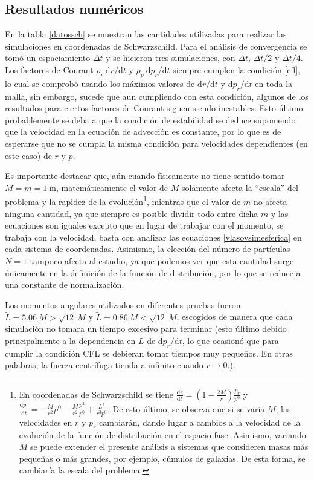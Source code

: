 \documentclass[11pt,twoside,openright,spanish]{report}
\numberwithin{equation}{chapter}
\numberwithin{figure}{chapter}
\numberwithin{table}{chapter}
\begin{document}
\subsection{Resultados numéricos}
\noindent
En la tabla \ref{datossch} se muestran las cantidades utilizadas para realizar las simulaciones en coordenadas de Schwarzschild. Para el análisis de convergencia se tomó un espaciamiento $\Delta t$ y se hicieron tres simulaciones, con $\Delta t$, $\Delta t/2$ y $\Delta t/4$. Los factores de Courant $\rho_r\ \text{d}r/\text{d}t$ y $\rho_p\ \text{d}p_r/\text{d}t$ siempre cumplen la condición \eqref{cfl}, lo cual se comprobó usando los máximos valores de $\text{d}r/\text{d}t$ y $\text{d}p_r/\text{d}t$ en toda la malla, sin embargo, sucede que aun cumpliendo con esta condición, algunos de los resultados para ciertos factores de Courant siguen siendo inestables. Esto último probablemente se deba a que la condición de estabilidad se deduce suponiendo que la velocidad en la ecuación de advección es constante, por lo que es de esperarse que no se cumpla la misma condición para velocidades dependientes (en este caso) de $r$ y $p$. 

Es importante destacar que, aún cuando físicamente no tiene sentido tomar $M=m=1\ \text{m}$, matemáticamente el valor de $M$ solamente afecta la ``escala'' del problema y la rapidez de la evolución\footnote{En coordenadas de Schwarzschild se tiene $\frac{\text{d}r}{\text{d}t}=\left(1-\frac{2M}{r}\right)\frac{p_r}{p^0}$ y $\frac{\text{d}p_r}{\text{d}t}=-\frac{M}{r^2}p^0-\frac{M}{r^2}\frac{p_r^2}{p^0}+\frac{L^2}{r^3p^0}$. De esto último, se observa que si se varía $M$, las velocidades en $r$ y $p_r$ cambiarán, dando lugar a cambios a la velocidad de la evolución de la función de distribución en el espacio-fase. Asimismo, variando $M$ se puede extender el presente análisis a sistemas que consideren masas más pequeñas o más grandes, por ejemplo, cúmulos de galaxias. De esta forma, se cambiaría la escala del problema.}, mientras que el valor de $m$ no afecta ninguna cantidad, ya que siempre es posible dividir todo entre dicha $m$ y las ecuaciones son iguales excepto que en lugar de trabajar con el momento, se trabaja con la velocidad, basta con analizar las ecuaciones \eqref{vlasovsimesferica} en cada sistema de coordenadas. Asimismo, la elección del número de partículas $N=1$ tampoco afecta al estudio, ya que  podemos ver que esta cantidad surge únicamente en la definición de la función de distribución, por lo que se reduce a una constante de normalización.

Los momentos angulares utilizados en diferentes pruebas fueron $\tilde{L}=5.06\ M>\sqrt{12}\ M$ y $\tilde{L}=0.86\ M<\sqrt{12}\ M$, escogidos de manera que cada simulación no tomara un tiempo excesivo para terminar (esto último debido principalmente a la dependencia en $L$ de $\text{d}p_r/\text{d}t$, lo que ocasionó que para cumplir la condición CFL se debieran tomar tiempos muy pequeños. En otras palabras, la fuerza centrífuga tienda a infinito cuando $r\rightarrow 0$.).
\end{document}
